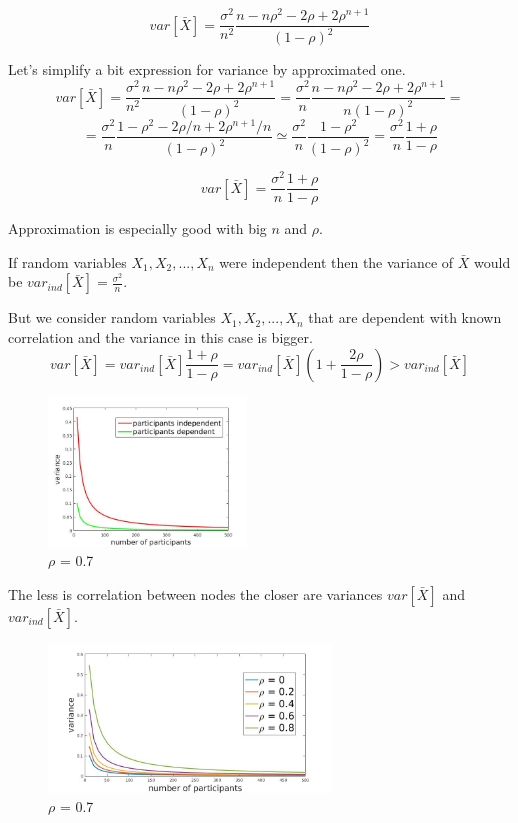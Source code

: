 \documentclass[12pt]{report}
\begin{document}
$$ var\left[\bar{X} \right] = \frac{\sigma^2}{n^2} \frac{n-n\rho^2 - 2\rho + 2\rho^{n+1}}{(1-\rho)^2}$$



Let's simplify a bit expression for variance by approximated one.
$$var\left[\bar{X} \right] = \frac{\sigma^2}{n^2} \frac{n-n\rho^2 - 2\rho + 2\rho^{n+1}}{(1-\rho)^2} = \frac{\sigma^2}{n} \frac{n-n\rho^2 - 2\rho + 2\rho^{n+1}}{n(1-\rho)^2} = $$
$$= \frac{\sigma^2}{n} \frac{1-\rho^2 - 2\rho/n + 2\rho^{n+1}/n}{(1-\rho)^2} \simeq \frac{\sigma^2}{n} \frac{1-\rho^2}{(1-\rho)^2} = \frac{\sigma^2}{n} \frac{1+\rho}{1-\rho}$$

$$var\left[\bar{X} \right] = \frac{\sigma^2}{n} \frac{1+\rho}{1-\rho}$$


Approximation is especially good with big $n$ and $\rho$.

If random variables $X_1, X_2, ..., X_n$ were independent then the variance of $\bar{X}$ would be $var_{ind}[\bar{X}] = \frac{\sigma^2}{n}$.

But we consider random variables $X_1, X_2, ..., X_n$ that are dependent with known correlation and the variance in this case is bigger. 
$$ var\left[\bar{X} \right] = var_{ind}[\bar{X}]\frac{1+\rho}{1-\rho} = var_{ind}[\bar{X}]
\left(1+ \frac{2\rho}{1-\rho} \right) > var_{ind}[\bar{X}]$$


\begin{figure}[ht]
    \centering
    \includegraphics[height=150px]{varianceIndDep}
    \caption{ $\rho$ = 0.7 }
\end{figure}

The less is correlation between nodes the closer are variances $var\left[\bar{X} \right]$ and $var_{ind}[\bar{X}]$.


\begin{figure}[ht]
    \centering
    \includegraphics[height=150px]{varianceIndDep2}
    \caption{ $\rho$ = 0.7 }
\end{figure}
\end{document}
